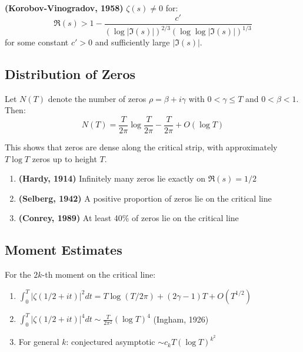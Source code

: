 \begin{theorem}
\label{thm:improved_zerofree}
\textbf{(Korobov-Vinogradov, 1958)} $\zeta(s) \neq 0$ for:
\begin{equation}
\Re(s) > 1 - \frac{c'}{(\log |\Im(s)|)^{2/3}(\log \log |\Im(s)|)^{1/3}}
\end{equation}
for some constant $c' > 0$ and sufficiently large $|\Im(s)|$.
\end{theorem}

\subsection{Distribution of Zeros}

\begin{theorem}
\label{thm:riemann_vonmangoldt}
Let $N(T)$ denote the number of zeros $\rho = \beta + i\gamma$ with $0 < \gamma \leq T$ and $0 < \beta < 1$. Then:
\begin{equation}
N(T) = \frac{T}{2\pi} \log \frac{T}{2\pi} - \frac{T}{2\pi} + O(\log T)
\end{equation}
\end{theorem}

This shows that zeros are dense along the critical strip, with approximately $T \log T$ zeros up to height $T$.

\begin{theorem}
\label{thm:zeros_critical_line}
\begin{enumerate}[label=(\alph*)]
\item \textbf{(Hardy, 1914)} Infinitely many zeros lie exactly on $\Re(s) = 1/2$
\item \textbf{(Selberg, 1942)} A positive proportion of zeros lie on the critical line
\item \textbf{(Conrey, 1989)} At least 40\% of zeros lie on the critical line
\end{enumerate}
\end{theorem}

\subsection{Moment Estimates}

\begin{theorem}
\label{thm:moments_critical}
For the $2k$-th moment on the critical line:
\begin{enumerate}[label=(\alph*)]
\item $\int_0^T |\zeta(1/2 + it)|^2 dt = T \log(T/2\pi) + (2\gamma - 1)T + O(T^{1/2})$
\item $\int_0^T |\zeta(1/2 + it)|^4 dt \sim \frac{T}{2\pi^2} (\log T)^4$ (Ingham, 1926)
\item For general $k$: conjectured asymptotic $\sim c_k T(\log T)^{k^2}$
\end{enumerate}
\end{theorem}

